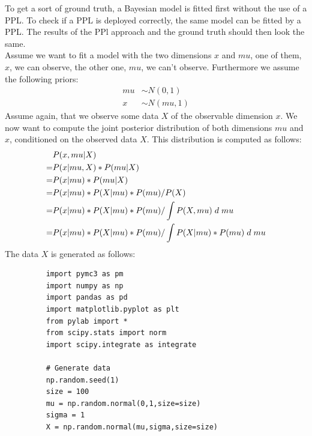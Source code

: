 \documentclass{article}
\begin{document}
To get a sort of ground truth, a Bayesian model is fitted first without the use of a PPL. To check if a PPL is deployed correctly, the same model can be fitted by a PPL. The results of the PPl approach and the ground truth should then look the same.
\\
Assume we want to fit a model with the two dimensions $x$ and $mu$, one of them, $x$, we can observe, the other one, $mu$, we can't observe. Furthermore we assume the following priors:
\begin{equation}
\begin{split}
mu &\sim N(0,1)\\
x &\sim N(mu,1)
\end{split}
\end{equation}
Assume again, that we observe some data $X$ of the observable dimension $x$.
We now want to compute the joint posterior distribution of both dimensions $mu$ and $x$, conditioned on the observed data $X$.
This distribution is computed as follows:
\begin{equation}
\begin{split}
&P(x,mu|X) \\
= &P(x|mu,X) * P(mu|X) \\
= &P(x|mu) * P(mu|X) \\
= &P(x|mu) * P(X|mu) * P(mu) / P(X) \\
= &P(x|mu) * P(X|mu) * P(mu) / \int P(X,mu) \hspace{1mm} d \hspace{1mm} mu \\
= &P(x|mu) * P(X|mu) * P(mu) / \int P(X|mu) * P(mu) \hspace{1mm} d \hspace{1mm} mu
\end{split}
\end{equation}
The data $X$ is generated as follows:\\
\begin{figure}[h]
	\begin{lstlisting}
	import pymc3 as pm
	import numpy as np
	import pandas as pd
	import matplotlib.pyplot as plt
	from pylab import *
	from scipy.stats import norm
	import scipy.integrate as integrate
	
	# Generate data
	np.random.seed(1)
	size = 100
	mu = np.random.normal(0,1,size=size)
	sigma = 1
	X = np.random.normal(mu,sigma,size=size)

	\end{lstlisting}
	\label{fig:groundtruth_example_code_data_generation}
\end{figure}
\end{document}

